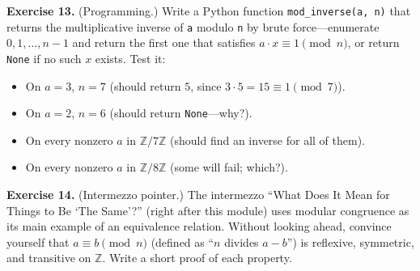 \documentclass[11pt]{article}
\begin{document}
\textbf{Exercise 13.}\label{ex:m6:13} (Programming.) Write a Python function \texttt{mod\_inverse(a, n)} that returns the multiplicative inverse of \texttt{a} modulo \texttt{n} by brute force---enumerate $0, 1, \ldots, n-1$ and return the first one that satisfies $a \cdot x \equiv 1 \pmod n$, or return \texttt{None} if no such $x$ exists. Test it:
\begin{itemize}
  \item On $a = 3$, $n = 7$ (should return $5$, since $3 \cdot 5 = 15 \equiv 1 \pmod 7$).
  \item On $a = 2$, $n = 6$ (should return \texttt{None}---why?).
  \item On every nonzero $a$ in $\mathbb{Z}/7\mathbb{Z}$ (should find an inverse for all of them).
  \item On every nonzero $a$ in $\mathbb{Z}/8\mathbb{Z}$ (some will fail; which?).
\end{itemize}

\bigskip
\textbf{Exercise 14.}\label{ex:m6:14} (Intermezzo pointer.) The intermezzo ``What Does It Mean for Things to Be `The Same'?'' (right after this module) uses modular congruence as its main example of an equivalence relation. Without looking ahead, convince yourself that $a \equiv b \pmod n$ (defined as ``$n$ divides $a - b$'') is reflexive, symmetric, and transitive on $\mathbb{Z}$. Write a short proof of each property.
\end{document}

